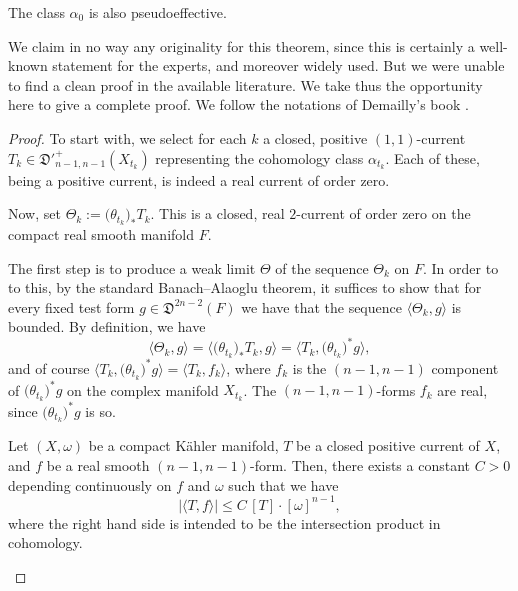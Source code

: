\begin{appendix}
\begin{theorem} \label{limitpseff}
The class $\alpha_0$ is also pseudoeffective.
\end{theorem}

We claim in no way any originality for this theorem, since this is certainly a well-known statement for the experts, and moreover widely used. But we were unable to find a clean proof in the available literature. We take thus the opportunity here to give a complete proof. We follow the notations of Demailly's book \cite{Dem12}.

\begin{proof}
To start with, we select for each $k$ a closed, positive $(1,1)$-current $T_{k}\in\mathfrak D'^+_{n-1,n-1}(X_{t_k})$ representing the cohomology class $\alpha_{t_k}$. Each of these, being a positive current, is indeed a real current of order zero.

Now, set $\Theta_{k}:=\bigl(\theta_{t_k}\bigr)_*T_k$. This is a closed, real $2$-current of order zero on the compact real smooth manifold $F$.

The first step is to produce a weak limit $\Theta$ of the sequence $\Theta_k$ on $F$. In order to to this, by the standard Banach--Alaoglu theorem, it suffices to show that for every fixed test form $g\in\mathfrak D^{2n-2}(F)$ we have that the sequence $\langle \Theta_k,g\rangle$ is bounded. By definition, we have
\[
\langle \Theta_k,g\rangle= \bigl\langle \bigl(\theta_{t_k}\bigr)_*T_k,g\bigr\rangle=\bigl\langle T_k,\bigl(\theta_{t_k}\bigr)^*g\bigr\rangle,
\]
and of course $\bigl\langle T_k,\bigl(\theta_{t_k}\bigr)^*g\bigr\rangle=\langle T_k,f_k\rangle$, where $f_k$ is the $(n-1,n-1)$ component of $\bigl(\theta_{t_k}\bigr)^*g$ on the complex manifold $X_{t_k}$. The $(n-1,n-1)$-forms $f_k$ are real, since $\bigl(\theta_{t_k}\bigr)^*g$ is so.

\begin{lemma}
Let $(X,\omega)$ be a compact Kähler manifold, $T$ be a closed positive current of $X$, and $f$ be a real smooth $(n-1,n-1)$-form. Then, there exists a constant $C>0$ depending continuously on $f$ and $\omega$ such that we have
\[
|\langle T, f\rangle|\le C\, [T]\cdot[\omega]^{n-1},
\]
where the right hand side is intended to be the intersection product in cohomology.
\end{lemma}


\end{proof}
\end{appendix}
